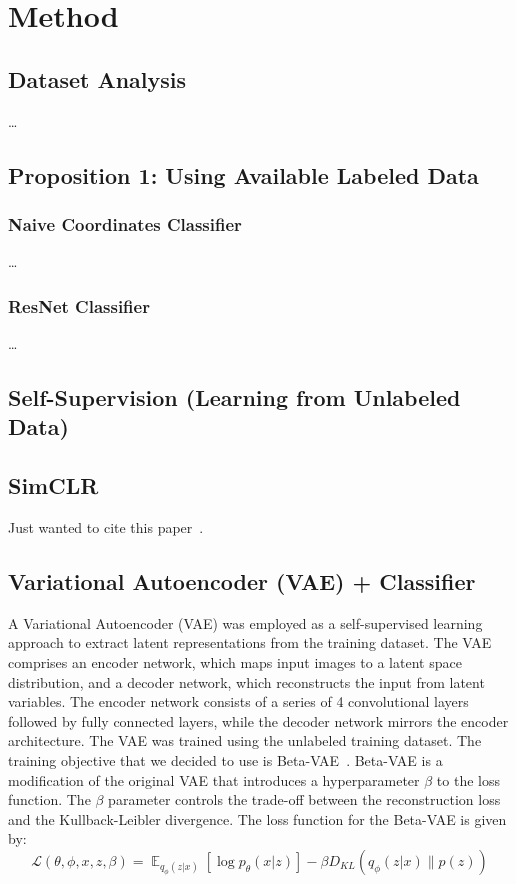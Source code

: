 \documentclass{article}
\DeclareMathOperator{\E}{\mathbb{E}}
\begin{document}
\section{Method}\label{sec:method}

\subsection{Dataset Analysis}
\dots

\subsection{Proposition 1: Using Available Labeled Data}
\subsubsection{Naive Coordinates Classifier}
\dots

\subsubsection{ResNet Classifier}
\dots

\subsection{Self-Supervision (Learning from Unlabeled Data)}

\subsection{SimCLR}
Just wanted to cite this paper~\cite{simclr}.

\subsection{Variational Autoencoder (VAE) + Classifier}

A Variational Autoencoder (VAE) was employed as a self-supervised learning approach to extract latent representations from the training dataset. The VAE comprises an encoder network, which maps input images to a latent space distribution, and a decoder network, which reconstructs the input from latent variables. The encoder network consists of a series of 4 convolutional layers followed by fully connected layers, while the decoder network mirrors the encoder architecture. The VAE was trained using the unlabeled training dataset. The training objective that we decided to use is Beta-VAE~\cite{beta-vae}. Beta-VAE is a modification of the original VAE that introduces a hyperparameter $\beta$ to the loss function. The $\beta$ parameter controls the trade-off between the reconstruction loss and the Kullback-Leibler divergence. The loss function for the Beta-VAE is given by:
$$\mathcal{L}(\theta, \phi, x, z, \beta) = \E_{q_\phi(z|x)}[\log p_\theta(x|z)] - \beta D_{KL}(q_\phi(z|x)\| p(z))$$
\end{document}

